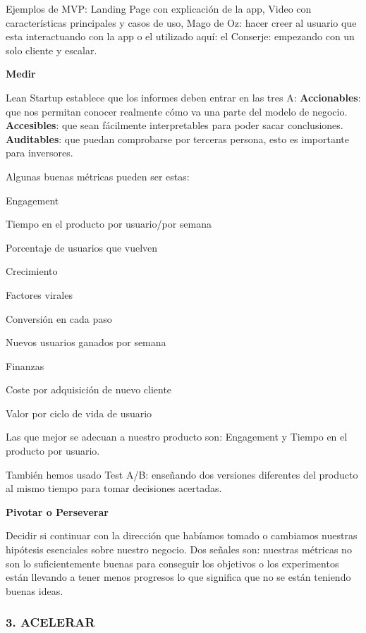 \documentclass[12pt,twoside,titlepage]{report}
\begin{document}
Ejemplos de MVP: Landing Page con explicación de la app, Video con características principales y casos de uso, Mago de Oz: hacer creer al usuario que esta interactuando con la app o el utilizado aquí: el Conserje: empezando con un solo cliente y escalar.

\textbf{Medir}

Lean Startup establece que los informes deben entrar en las tres A: \textbf{Accionables}: que nos permitan conocer realmente cómo va una parte del modelo de negocio. \textbf{Accesibles}: que sean fácilmente interpretables para poder sacar conclusiones. \textbf{Auditables}: que puedan comprobarse por terceras persona, esto es importante para inversores.

Algunas buenas métricas pueden ser estas: 
\begin{compactitem}
    \item Engagement
    \item Tiempo en el producto por usuario/por semana
    \item Porcentaje de usuarios que vuelven
    \item Crecimiento
    \item Factores virales
    \item Conversión en cada paso
    \item Nuevos usuarios ganados por semana
    \item Finanzas
    \item Coste por adquisición de nuevo cliente
    \item Valor por ciclo de vida de usuario
\end{compactitem}


Las que mejor se adecuan a nuestro producto son: Engagement y Tiempo en el producto por usuario.

También hemos usado Test A/B: enseñando dos versiones diferentes del producto al mismo tiempo para tomar decisiones acertadas.

\textbf{Pivotar o Perseverar}

Decidir si continuar con la dirección que habíamos tomado o cambiamos nuestras hipótesis esenciales sobre nuestro negocio. Dos señales son: nuestras métricas no son lo suficientemente buenas para conseguir los objetivos o los experimentos están llevando a tener menos progresos lo que significa que no se están teniendo buenas ideas.

\subsubsection{3. ACELERAR}
\end{document}
